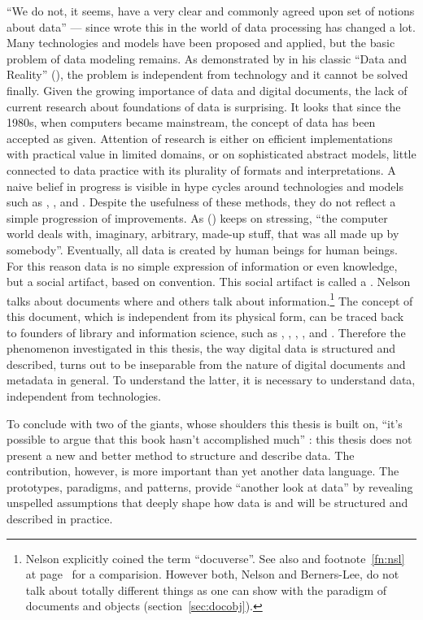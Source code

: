 ``We do not, it seems, have a very clear and commonly agreed upon set of
notions about data'' --- since  wrote this in
\citeyear{Mealy1967} the world of data processing has changed a lot. Many
technologies and models have been proposed and applied, but the basic problem
of data modeling remains. As demonstrated by  in his
classic ``Data and Reality'' (\citeyear{Kent1978}), the problem is independent
from technology and it cannot be solved finally. Given the growing importance
of data and digital documents, the lack of current research about foundations
of data is surprising. It looks that since the 1980s, when computers became
mainstream, the concept of data has been accepted as given. Attention of
research is either on efficient implementations with practical value in limited
domains, or on sophisticated abstract models, little connected to data practice
with its plurality of formats and interpretations. A naive belief in progress
is visible in hype cycles around technologies and models such as ,
,  and . Despite the usefulness of
these methods, they do not reflect a simple progression of improvements.  As
 (\citeyear{Nelson2012}) keeps on stressing, ``the computer
world deals with, imaginary, arbitrary, made-up stuff, that was all made up by
somebody''. Eventually, all data is created by human beings for human beings.
For this reason data is no simple expression of information or even knowledge,
but a social artifact, based on convention.  This social artifact is called a
. Nelson talks about documents where 
and others talk about information.\footnote{Nelson explicitly coined the term
	``docuverse''. See also \textcite[300]{Nelson2010} and
	footnote~\ref{fn:nsl} at page~\pageref{fn:nsl} for a comparision. However
	both, Nelson and Berners-Lee, do not talk about totally different things as
one can show with the paradigm of documents and objects
(section~\ref{sec:docobj}).} The concept of this document, which is independent
from its physical form, can be traced back to founders of library and
information science, such as \textcite{Bush1945}, \textcite{Otlet1934},
 \cite{Hapke1999}, 
\cite{Buckland2006}, and \textcite{Briet1951}. Therefore the phenomenon
investigated in this thesis, the way digital data is structured and described,
turns out to be inseparable from the nature of digital documents and metadata
in general. To understand the latter, it is necessary to understand data,
independent from technologies.

To conclude with two of the giants, whose shoulders this thesis is built on,
``it's possible to argue that this book hasn't accomplished much''
\cite[351]{Gamma1994}: this thesis does not present a new and better method to
structure and describe data. The contribution, however, is more important than
yet another data language. The prototypes, paradigms, and patterns, provide
``another look at data'' \cite{Mealy1967} by revealing unspelled assumptions
that deeply shape how data is and will be structured and described in practice.

